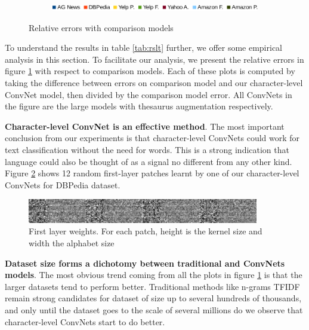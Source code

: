 \documentclass{article} %
\begin{document}
\begin{figure}[ht]
  \begin{subfigure}[b]{0.7\textwidth}
    \includegraphics[width=\textwidth]{legend}
  \end{subfigure}
  
  \caption{Relative errors with comparison models}
  \label{fig:comp}
\end{figure}

To understand the results in table \ref{tab:rslt} further, we offer some empirical analysis in this section. To facilitate our analysis, we present the relative errors in figure \ref{fig:comp} with respect to comparison models. Each of these plots is computed by taking the difference between errors on comparison model and our character-level ConvNet model, then divided by the comparison model error. All ConvNets in the figure are the large models with thesaurus augmentation respectively.

\textbf{Character-level ConvNet is an effective method}. The most important conclusion from our experiments is that character-level ConvNets could work for text classification without the need for words. This is a strong indication that language could also be thought of as a signal no different from any other kind. Figure \ref{fig:weig} shows 12 random first-layer patches learnt by one of our character-level ConvNets for DBPedia dataset.

\begin{figure}[ht]
  \begin{center}
    \includegraphics[width=0.90\textwidth]{dbpd_1layer}
  \end{center}
  \caption{First layer weights. For each patch, height is the kernel size and width the alphabet size}
  \label{fig:weig}
\end{figure}

\textbf{Dataset size forms a dichotomy between traditional and ConvNets models}. The most obvious trend coming from all the plots in figure \ref{fig:comp} is that the larger datasets tend to perform better. Traditional methods like n-grams TFIDF remain strong candidates for dataset of size up to several hundreds of thousands, and only until the dataset goes to the scale of several millions do we observe that character-level ConvNets start to do better.
\end{document}
